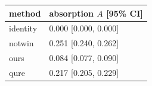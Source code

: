 \begin{tabular}{ll}
\toprule
method & absorption $A$ [95\% CI] \\
\midrule
identity & 0.000 [0.000, 0.000] \\
notwin & 0.251 [0.240, 0.262] \\
ours & 0.084 [0.077, 0.090] \\
qure & 0.217 [0.205, 0.229] \\
\bottomrule
\end{tabular}
